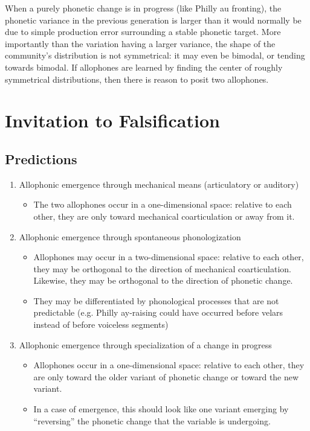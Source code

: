 When a purely phonetic change is in progress (like Philly au fronting), the phonetic variance in the previous generation is larger than it would normally be due to simple production error surrounding a stable phonetic target. More importantly than the variation having a larger variance, the shape of the community's distribution is not symmetrical: it may even be bimodal, or tending towards bimodal. If allophones are learned by finding the center of roughly symmetrical distributions, then there is reason to posit two allophones.





\section{Invitation to Falsification}
\label{test}

\subsection{Predictions}
\begin{enumerate}
\item Allophonic emergence through mechanical means (articulatory or auditory)
	\begin{itemize}
		\item The two allophones occur in a one-dimensional space: relative to each other, they are only toward mechanical coarticulation or away from it.
	\end{itemize}
\item Allophonic emergence through spontaneous phonologization
	\begin{itemize}
		\item Allophones may occur in a two-dimensional space: relative to each other, they may be orthogonal to the direction of mechanical coarticulation. Likewise, they may be orthogonal to the direction of phonetic change.
		\item They may be differentiated by phonological processes that are not predictable (e.g. Philly ay-raising could have occurred before velars instead of before voiceless segments)
	\end{itemize}
\item Allophonic emergence through specialization of a change in progress
	\begin{itemize}
		\item Allophones occur in a one-dimensional space: relative to each other, they are only toward the older variant of phonetic change or toward the new variant.
		\item In a case of emergence, this should look like one variant emerging by ``reversing'' the phonetic change that the variable is undergoing.
	\end{itemize}
\end{enumerate}


